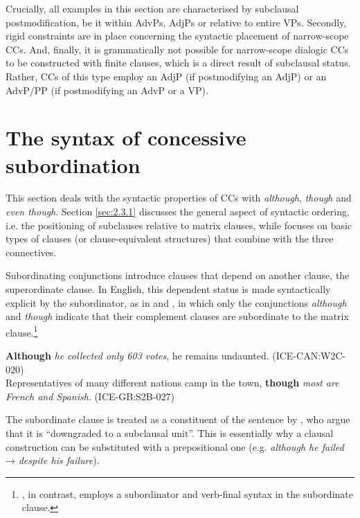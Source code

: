 Crucially, all examples in this section are characterised by subclausal postmodification, be it within AdvPs, AdjPs or relative to entire VPs. Secondly, rigid constraints are in place concerning the syntactic placement of narrow-scope CCs. And, finally, it is grammatically not possible for narrow-scope dialogic CCs to be constructed with finite clauses, which is a direct result of subclausal status. Rather, CCs of this type employ an AdjP (if postmodifying an AdjP) or an AdvP/PP (if postmodifying an AdvP or a VP).

\section{\label{bkm:Ref35085173}The syntax of concessive subordination}\label{sec:2.3}

This section deals with the syntactic properties of CCs with \textit{although}, \textit{though} and \textit{even though}. Section \ref{sec:2.3.1} discusses the general aspect of syntactic ordering, i.e. the positioning of subclauses relative to matrix clauses, while  focuses on basic types of clauses (or clause-equivalent structures) that combine with the three connectives.

Subordinating conjunctions introduce clauses that depend on another clause, the super\-ordinate clause. In English, this dependent status is made syntactically explicit by the subordinator, as in  and , in which only the conjunctions \textit{although} and \textit{though} indicate that their complement clauses are subordinate to the matrix clause.\footnote{, in contrast, employs a subordinator and verb-final syntax in the subordinate clause.}

\ea\label{ex:27} \label{bkm:Ref470886714}  \label{bkm:Ref489777815}\textbf{Although} \textit{he collected only 603 votes}, he remains undaunted. (ICE-CAN:W2C-020)\\
    \ex\label{ex:28} \label{bkm:Ref470886719}  \label{bkm:Ref489777822}Representatives of many different nations camp in the town, \textbf{though} \textit{most are French and Spanish}. (ICE-GB:S2B-027)\\
\z

The subordinate clause is treated as a constituent of the sentence by \citet[987]{QuirkEtAl1985}, who argue that it is “downgraded to a subclausal unit”. This is essentially why a clausal construction can be substituted with a prepositional one (e.g. \textit{although he failed} → \textit{despite his failure}).

